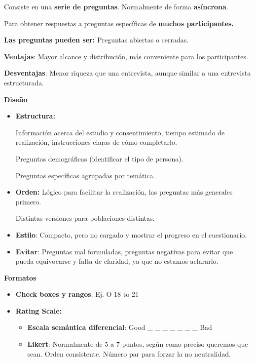 \documentclass[12pt, twoside, openright]{report} %
\begin{document}
Consiste en una \textbf{serie de preguntas}. Normalmente de forma
\textbf{asíncrona}.

Para obtener respuestas a preguntas específicas de \textbf{muchos
	participantes.}

\textbf{Las preguntas pueden ser:} Preguntas abiertas o cerradas.

\textbf{Ventajas}: Mayor alcance y distribución, más conveniente para
los participantes.

\textbf{Desventajas}: Menor riqueza que una entrevista, aunque similar a
una entrevista estructurada.

\textbf{Diseño}

\begin{itemize}
	\item \textbf{Estructura:}

	      Información acerca del estudio y consentimiento, tiempo estimado de
	      realización, instrucciones claras de cómo completarlo.

	      Preguntas demográficas (identificar el tipo de persona).

	      Preguntas específicas agrupadas por temática.
	\item \textbf{Orden:} Lógico para facilitar la realización, las preguntas
	      más generales primero.

	      Distintas versiones para poblaciones distintas.
	\item \textbf{Estilo}: Compacto, pero no cargado y mostrar el progreso en el
	      cuestionario.
	\item \textbf{Evitar}: Preguntas mal formuladas, preguntas negativas para
	      evitar que pueda equivocarse y falta de claridad, ya que no estamos
	      aclararlo.
\end{itemize}

\textbf{Formatos}

\begin{itemize}
	\item \textbf{Check boxes y rangos}. Ej. O 18 to 21
	\item \textbf{Rating Scale:}

	      \begin{itemize}
		      \item \textbf{Escala semántica diferencial}: Good \_ \_ \_ \_ \_ \_ \_ Bad
		      \item \textbf{Likert}: Normalmente de 5 a 7 puntos, según como preciso
		            queremos que sean. Orden consistente. Número par para forzar la no
		            neutralidad.
	      \end{itemize}
\end{itemize}
\end{document}
